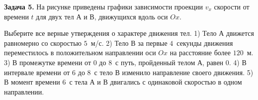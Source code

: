 
\begin{taskbasic}[code={\label{task:dem26_v27_n5}}]
\textbf{Задача 5.} На рисунке приведены графики зависимости проекции $v_x$ скорости от времени $t$ для двух тел А и В, движущихся вдоль оси $Ox$. 

\nopagebreak\smallskip
\begin{center}
\end{center}

Выберите все верные утверждения о характере движения тел.
1) Тело А движется равномерно со скоростью $5$~м/с.
2) Тело В за первые $4$~секунды движения переместилось в положительном направлении оси $Ox$ на расстояние более $120$~м.
3) В промежутке времени от $0$ до $8$~с путь, пройденный телом А, равен $0$.
4) В интервале времени от $6$ до $8$~с тело В изменило направление своего движения.
5) В момент времени $6$~с тела А и В двигались с одинаковой скоростью в одном направлении.

\end{taskbasic}


